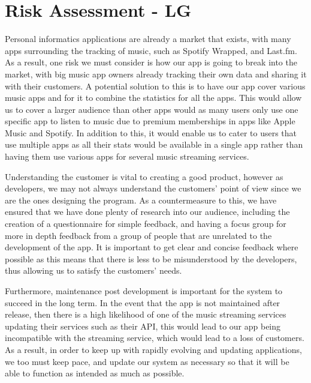 \documentclass[11pt]{report}
\begin{document}
\chapter{Risk Assessment - LG}
Personal informatics applications are already a market that exists, with many apps surrounding the tracking of music, such as Spotify Wrapped, and Last.fm.  As a result, one risk we must consider is how our app is going to break into the market, with big music app owners already tracking their own data and sharing it with their customers.   A potential solution to this is to have our app cover various music apps and for it to combine the statistics for all the apps.  This would allow us to cover a larger audience than other apps would as many users only use one specific app to listen to music due to premium memberships in apps like Apple Music and Spotify.  In addition to this, it would enable us to cater to users that use multiple apps as all their stats would be available in a single app rather than having them use various apps for several music streaming services.

Understanding the customer is vital to creating a good product, however as developers, we may not always understand the customers’ point of view since we are the ones designing the program.  As a countermeasure to this, we have ensured that we have done plenty of research into our audience, including the creation of a questionnaire for simple feedback, and having a focus group for more in depth feedback from a group of people that are unrelated to the development of the app.  It is important to get clear and concise feedback where possible as this means that there is less to be misunderstood by the developers, thus allowing us to satisfy the customers’ needs.

Furthermore, maintenance post development is important for the system to succeed in the long term.  In the event that the app is not maintained after release, then there is a high likelihood of one of the music streaming services updating their services such as their API, this would lead to our app being incompatible with the streaming service, which would lead to a loss of customers.  As a result, in order to keep up with rapidly evolving and updating applications, we too must keep pace, and update our system as necessary so that it will be able to function as intended as much as possible.
\end{document}
